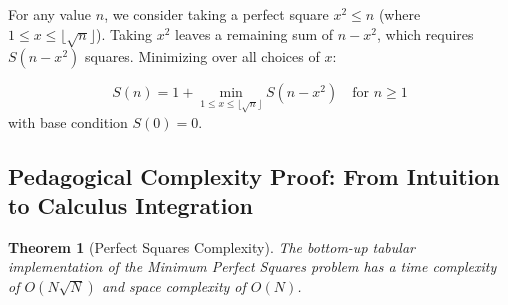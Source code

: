 \documentclass[10pt,journal,compsoc,onecolumn]{IEEEtran}
\newtheorem{theorem}{Theorem}
\begin{document}
For any value $n$, we consider taking a perfect square $x^2 \le n$ (where $1 \le x \le \lfloor \sqrt{n} \rfloor$). Taking $x^2$ leaves a remaining sum of $n - x^2$, which requires $S(n - x^2)$ squares. Minimizing over all choices of $x$:

\[
S(n) = 1 + \min_{1 \le x \le \lfloor \sqrt{n} \rfloor} S(n - x^2) \quad \text{for } n \ge 1
\]
with base condition $S(0) = 0$.

\subsection{Pedagogical Complexity Proof: From Intuition to Calculus Integration}

\begin{theorem}[Perfect Squares Complexity]
The bottom-up tabular implementation of the Minimum Perfect Squares problem has a time complexity of $O(N \sqrt{N})$ and space complexity of $O(N)$.
\end{theorem}
\end{document}
